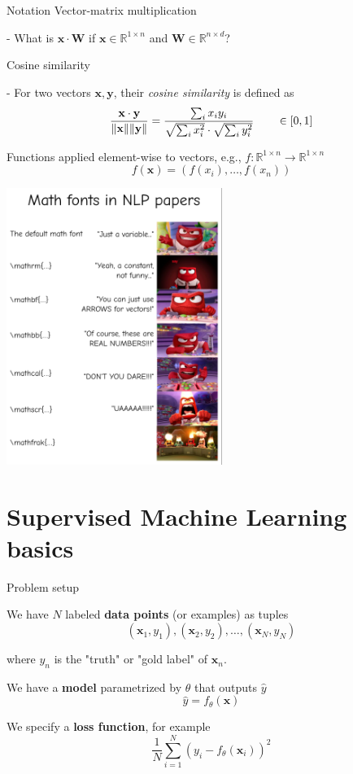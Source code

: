 \documentclass[12pt]{beamer}
\begin{document}
\begin{frame}{Notation}
Vector-matrix multiplication

- What is $\mathbf{x} \cdot \mathbf{W}$ if $\mathbf{x} \in \mathbb{R}^{1 \times n}$ and $\mathbf{W} \in \mathbb{R}^{n \times d}$?

Cosine similarity

- For two vectors $\mathbf{x}, \mathbf{y}$, their \emph{cosine similarity} is defined as
$$
\frac{\mathbf{x} \cdot \mathbf{y}}{\norm{\mathbf{x}} \norm{\mathbf{y}}} =
\frac{\sum_i x_i y_i}{\sqrt{\sum_i {x_i^2}} \cdot \sqrt{\sum_i{y_i^2}}} \qquad \in \mathopen[ 0, 1\mathclose]
$$

Functions applied element-wise to vectors, e.g., $f: \mathbb{R}^{1 \times n} \to \mathbb{R}^{1 \times n}$
$$
f(\mathbf{x}) = (f(x_i), \dots, f(x_n))
$$

\end{frame}

\begin{frame}

\begin{center}
	\includegraphics[width=7cm]{img/FQNlPsJXoAYMSd1.png}
\end{center}

\end{frame}

\section{Supervised Machine Learning basics}

\begin{frame}{Problem setup}
	
We have $N$ labeled \textbf{data points} (or examples) as tuples
$$
(\mathbf{x}_1, y_1), (\mathbf{x}_2, y_2), \dots, (\mathbf{x}_N, y_N)
$$

where $y_n$ is the "truth" or "gold label" of $\mathbf{x}_n$.

We have a \textbf{model} parametrized by $\theta$ that outputs $\hat{y}$
$$
\hat{y} = f_{\theta}(\mathbf{x})
$$
	
We specify a \textbf{loss function}, for example
$$
\frac{1}{N} \sum_{i = 1}^{N} \left( y_i - f_{\theta}(\mathbf{x}_i) \right)^2
$$
	
\end{frame}
\end{document}
